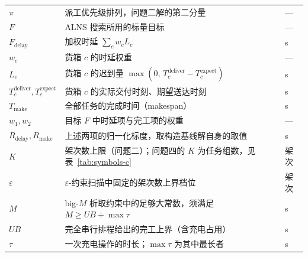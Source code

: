 \begin{table}[htbp]
\begin{tabularx}{\textwidth}{@{}l X l@{}}
		$\pi$ & 派工优先级排列，问题二解的第二分量 & --- \\
		$F$ & ALNS 搜索所用的标量目标 & --- \\
		$F_{\mathrm{delay}}$ & 加权时延 $\sum_c w_c L_c$ & s \\
		$w_c$ & 货箱 $c$ 的时延权重 & --- \\
		$L_c$ & 货箱 $c$ 的迟到量 $\max(0,\,T_c^{\mathrm{deliver}}-T_c^{\mathrm{expect}})$ & s \\
		$T_c^{\mathrm{deliver}},T_c^{\mathrm{expect}}$ & 货箱 $c$ 的实际交付时刻、期望送达时刻 & s \\
		$T_{\mathrm{make}}$ & 全部任务的完成时间（makespan） & s \\
		$w_1,w_2$ & 目标 $F$ 中时延项与完工项的权重 & --- \\
		$R_{\mathrm{delay}},R_{\mathrm{make}}$ & 上述两项的归一化标度，取构造基线解自身的取值 & s \\
		$K$ & 架次数上限（问题二）；问题四的 $K$ 为任务组数，见表~\ref{tab:symbols-c} & 架次 \\
		$\varepsilon$ & $\varepsilon$-约束扫描中固定的架次数上界档位 & 架次 \\
		$M$ & big-$M$ 析取约束中的足够大常数，须满足 $M\ge UB+\max\tau$ & s \\
		$UB$ & 完全串行排程给出的完工上界（含充电占用） & s \\
		$\tau$ & 一次充电操作的时长；$\max\tau$ 为其中最长者 & s \\
		\bottomrule
	\end{tabularx}
\end{table}

